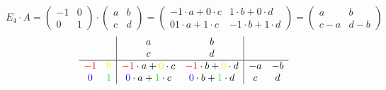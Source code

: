 \documentclass[9pt]{article} %
\begin{document}
\begin{bsp}
{\[\]
\[
E_4 \cdot A = \begin{pmatrix} 
-1 & 0\\
0 & 1
\end{pmatrix} 
\cdot 
\begin{pmatrix} 
a & b \\
c & d 
\end{pmatrix} 
=
\begin{pmatrix} 
-1 \cdot a + 0 \cdot c & 1 \cdot b + 0 \cdot d \\
01 \cdot a + 1 \cdot c & -1 \cdot b + 1 \cdot d 
\end{pmatrix}
=
\begin{pmatrix} 
a  & b \\
c-a & d-b
\end{pmatrix}
\]
\[
\begin{array}{cc|cc|cc}
  &  & a&b  \\ 
  & &  c & d   \\ \hline
  \textcolor{red}{-1} & \textcolor{yellow}{0} &  \textcolor{red}{-1} \cdot a + \textcolor{yellow}{0}  \cdot c & \textcolor{red}{-1} \cdot b + \textcolor{yellow}{0} \cdot d  & -a & -b \\
  \textcolor{blue}{0} & \textcolor{green}{1} &  \textcolor{blue}{0} \cdot a + \textcolor{green}{1}  \cdot c &  \textcolor{blue}{0} \cdot b + \textcolor{green}{1} \cdot d  & c & d
\end{array}
\]
} 
\end{bsp}
\end{document}
